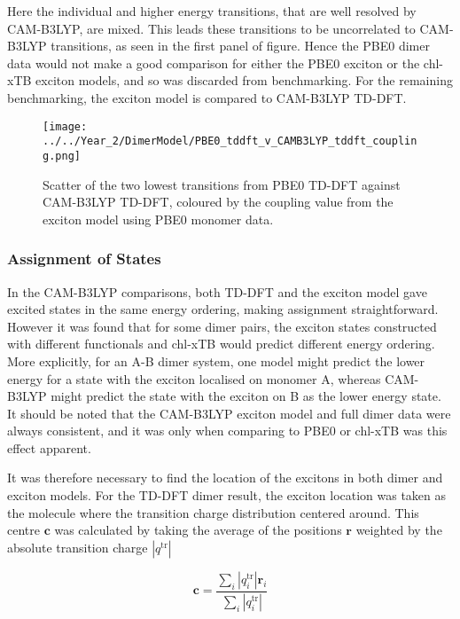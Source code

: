 Here the individual \Qy and higher energy transitions, that are well resolved by CAM-B3LYP,
are mixed. This leads these transitions to be uncorrelated to CAM-B3LYP transitions,
as seen in the first panel of figure. Hence the PBE0 dimer data would not make a 
good comparison for either the PBE0 exciton or the chl-xTB exciton models, and so
was discarded from benchmarking. For the remaining benchmarking, the exciton model
is compared to CAM-B3LYP TD-DFT.

\begin{figure}
    \centering
    \texttt{[image: ../../Year\_2/DimerModel/PBE0\_tddft\_v\_CAMB3LYP\_tddft\_coupling.png]}
    \label{fig:pbe0_camb3lyp_coupling}
    \caption{Scatter of the two lowest transitions from PBE0 TD-DFT against CAM-B3LYP
    TD-DFT, coloured by the coupling value from the exciton model using PBE0 monomer 
    data.}
\end{figure}

\afterpartskip
\subsubsection{Assignment of States}
\label{subsec:state_assign}

In the CAM-B3LYP comparisons, both TD-DFT and the exciton model gave excited states
in the same energy ordering, making assignment straightforward. However it was found
that for some dimer pairs, the exciton states constructed with different functionals 
and chl-xTB would predict different energy ordering. More explicitly, for an A-B 
dimer system, one model might predict the lower energy for a state with the exciton
localised on monomer A, whereas CAM-B3LYP might predict the state with the exciton
on B as the lower energy state. It should be noted that the CAM-B3LYP exciton model 
and full dimer data were always consistent, and it was only when comparing to PBE0 
or chl-xTB was this effect apparent.

It was therefore necessary to find the location of the excitons in both dimer and
exciton models. For the TD-DFT dimer result, the exciton location was taken as the
molecule where the transition charge distribution centered around. This centre
$\mathbf{c}$ was calculated by taking the average of the positions $\mathbf{r}$
weighted by the absolute transition charge $\left\lvert q^{\text{tr}} \right\rvert$

\begin{equation}
    \mathbf{c} = \frac{\sum_i \left\lvert q^{\text{tr}}_i \right\rvert \mathbf{r}_i}{\sum_i \left\lvert q^{\text{tr}}_i \right\rvert}
\end{equation}

